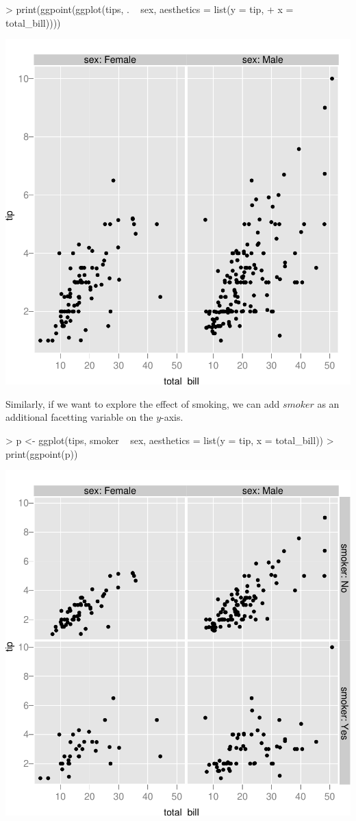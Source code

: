 \documentclass[]{article}
\begin{document}
\begin{Schunk}
\begin{Sinput}
> print(ggpoint(ggplot(tips, . ~ sex, aesthetics = list(y = tip, 
+     x = total_bill))))
\end{Sinput}
\end{Schunk}
\includegraphics{introduction-005}

Similarly, if we want to explore the effect of smoking, we can add $smoker$ as an additional facetting variable on the $y$-axis.

\begin{Schunk}
\begin{Sinput}
> p <- ggplot(tips, smoker ~ sex, aesthetics = list(y = tip, x = total_bill))
> print(ggpoint(p))
\end{Sinput}
\end{Schunk}
\includegraphics{introduction-006}
\end{document}
